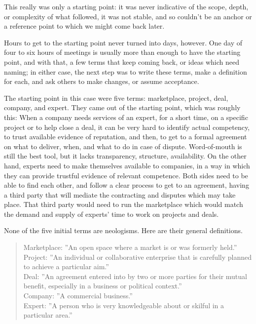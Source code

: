 \documentclass[graybox,envcountchap,sectrefs]{svmono}
\newcommand{\nterm}[1]{\textsf{#1}}
\begin{document}
This really was only a starting point: it was never indicative of the scope, depth, or complexity of what followed, it was not stable, and so couldn't be an anchor or a reference point to which we might come back later. 

Hours to get to the starting point never turned into days, however. One day of four to six hours of meetings is usually more than enough to have the starting point, and with that, a few terms that keep coming back, or ideas which need naming; in either case, the next step was to write these terms, make a definition for each, and ask others to make changes, or assume acceptance. 

The starting point in this case were five terms: \nterm{marketplace}, \nterm{project}, \nterm{deal}, \nterm{company}, and \nterm{expert}. They came out of the starting point, which was roughly this: When a company needs services of an expert, for a short time, on a specific project or to help close a deal, it can be very hard to identify actual competency, to trust available evidence of reputation, and then, to get to a formal agreement on what to deliver, when, and what to do in case of dispute. Word-of-mouth is still the best tool, but it lacks transparency, structure, availability. On the other hand, experts need to make themselves available to companies, in a way in which they can provide trustful evidence of relevant competence. Both sides need to be able to find each other, and follow a clear process to get to an agreement, having a third party that will mediate the contracting and disputes which may take place. That third party would need to run the marketplace which would match the demand and supply of experts' time to work on projects and deals.

None of the five initial terms are neologisms. Here are their general definitions. 
\begin{quote}
	Marketplace: ''An open space where a market is or was formerly held.'' \cite{oed-marketplace}\\
	Project: ''An individual or collaborative enterprise that is carefully planned to achieve a particular aim.'' \cite{oed-project}\\
	Deal: ''An agreement entered into by two or more parties for their mutual benefit, especially in a business or political context.''\cite{oed-deal}\\
	Company: ''A commercial business.''\cite{oed-company}\\
	Expert:  ''A person who is very knowledgeable about or skilful in a particular area.''\cite{oed-expert}
\end{quote}
\end{document}
